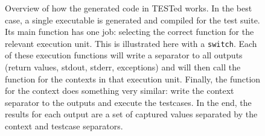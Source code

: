 \documentclass[../main]{subfiles}
\begin{document}
\begin{figure}
    \centering
    
    \caption{Overview of how the generated code in TESTed works.
        In the best case, a single executable is generated and compiled for the test suite.
        Its main function has one job: selecting the correct function for the relevant execution unit.
        This is illustrated here with a \texttt{switch}.
        Each of these execution functions will write a separator to all outputs (return values, stdout, stderr, exceptions) and will then call the function for the contexts in that execution unit.
        Finally, the function for the context does something very similar: write the context separator to the outputs and execute the testcases.
        In the end, the results for each output are a set of captured values separated by the context and testcase separators.
    }
    \label{fig:generated-code}
\end{figure}
\end{document}
